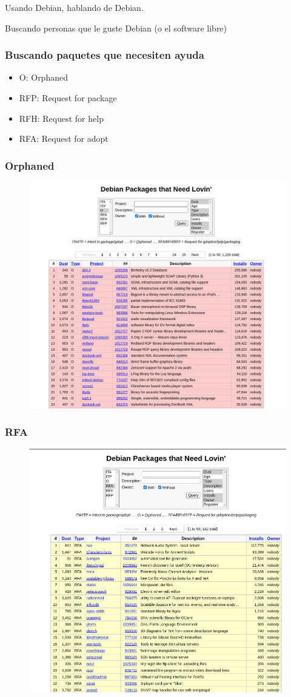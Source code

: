 \documentclass{beamer}
\begin{document}
\begin{frame}
  \centering
  \Huge Usando Debian, hablando de Debian.
\end{frame}

\begin{frame}
  \centering
  \Huge Buscando personas que le guste Debian (o el software libre)
\end{frame}

\begin{frame}
\frametitle{Buscando paquetes que necesiten ayuda}
  \begin{itemize}
    \item O: Orphaned
    \item RFP: Request for package
    \item RFH: Request for help
    \item RFA: Request for adopt
  \end{itemize}
\end{frame}
\begin{frame}
 \frametitle{Orphaned}
    \begin{figure}
		\centering
		\includegraphics[width=0.7\linewidth]{images/orphaned}
		\label{fig:Orphaned}
	\end{figure}
\end{frame}

\begin{frame}
 \frametitle{RFA}
    \begin{figure}
		\centering
		\includegraphics[width=0.7\linewidth]{images/rfa}
		\label{fig:rfa}
	\end{figure}
\end{frame}
\end{document}
